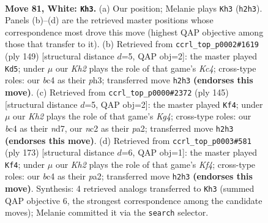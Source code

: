 \documentclass[11pt]{article}
\begin{document}
\clearpage

\begin{figure}[p]\centering
\begin{subfigure}{0.46\textwidth}\centering
\resizebox{\linewidth}{!}{%
\newchessgame
\chessboard[
  setfen={7k/8/8/8/2b2B2/8/2n2P1K/8 w - - 7 81},
  showmover=false,
  pgfstyle=straightmove, color=movearrow, markmove={h2-h3}
]}
\caption{}
\end{subfigure}\hfill
\begin{subfigure}{0.46\textwidth}\centering
\resizebox{\linewidth}{!}{%
\newchessgame
\chessboard[
  setfen={8/8/p7/2k5/8/2K1b1NP/8/8 b - - 2 75},
  showmover=false,
  pgfstyle=straightmove, color=movearrow, markmove={c5-d5}
]}
\caption{}
\end{subfigure}
\\[4pt]
\begin{subfigure}{0.46\textwidth}\centering
\resizebox{\linewidth}{!}{%
\newchessgame
\chessboard[
  setfen={3b4/3N4/8/3K2k1/8/p7/P7/8 b - - 3 73},
  showmover=false,
  pgfstyle=straightmove, color=movearrow, markmove={g5-f4}
]}
\caption{}
\end{subfigure}\hfill
\begin{subfigure}{0.46\textwidth}\centering
\resizebox{\linewidth}{!}{%
\newchessgame
\chessboard[
  setfen={8/8/8/5k2/4b2p/2K5/P7/6N1 b - - 3 87},
  showmover=false,
  pgfstyle=straightmove, color=movearrow, markmove={f5-f4}
]}
\caption{}
\end{subfigure}
\caption{\textbf{Move 81, White: \texttt{Kh3}.} (a) Our position; Melanie plays \texttt{Kh3} (\texttt{h2h3}). Panels (b)--(d) are the retrieved master positions whose correspondence most drove this move (highest QAP objective among those that transfer to it). (b) Retrieved from \texttt{ccrl\_top\_p0002\#1619} (ply 149) [structural distance $d$=5, QAP obj=2]: the master played \texttt{Kd5}; under $\mu$ our \emph{Kh2} plays the role of that game's \emph{Kc4}; cross-type roles: our \emph{b}c4 as their \emph{p}h3; transferred move \texttt{h2h3} \textbf{(endorses this move)}. (c) Retrieved from \texttt{ccrl\_top\_p0000\#2372} (ply 145) [structural distance $d$=5, QAP obj=2]: the master played \texttt{Kf4}; under $\mu$ our \emph{Kh2} plays the role of that game's \emph{Kg4}; cross-type roles: our \emph{b}c4 as their \emph{n}d7, our \emph{n}c2 as their \emph{p}a2; transferred move \texttt{h2h3} \textbf{(endorses this move)}. (d) Retrieved from \texttt{ccrl\_top\_p0003\#581} (ply 173) [structural distance $d$=6, QAP obj=1]: the master played \texttt{Kf4}; under $\mu$ our \emph{Kh2} plays the role of that game's \emph{Kf4}; cross-type roles: our \emph{b}c4 as their \emph{p}a2; transferred move \texttt{h2h3} \textbf{(endorses this move)}. Synthesis: 4 retrieved analogs transferred to \texttt{Kh3} (summed QAP objective 6, the strongest correspondence among the candidate moves); Melanie committed it via the \texttt{search} selector.}
\label{fig:thought-m160}
\end{figure}
\end{document}
